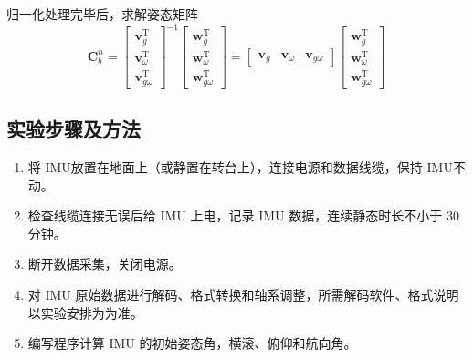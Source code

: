 \documentclass{ctexart}
\begin{document}
归一化处理完毕后，求解姿态矩阵
\begin{equation}
\mathbf{C}_{b}^{n}=\left[\begin{array}{c}
\boldsymbol{v}_{g}^{\mathrm{T}} \\
\boldsymbol{v}_{\omega}^{\mathrm{T}} \\
\boldsymbol{v}_{g \omega}^{\mathrm{T}}
\end{array}\right]^{-1}\left[\begin{array}{c}
\boldsymbol{w}_{g}^{\mathrm{T}} \\
\boldsymbol{w}_{\omega}^{\mathrm{T}} \\
\boldsymbol{w}_{g \omega}^{\mathrm{T}}
\end{array}\right]=\left[\begin{array}{lll}
\boldsymbol{v}_{g} & \boldsymbol{v}_{\omega} & \boldsymbol{v}_{g \omega}
\end{array}\right]\left[\begin{array}{c}
\boldsymbol{w}_{g}^{\mathrm{T}} \\
\boldsymbol{w}_{\omega}^{\mathrm{T}} \\
\boldsymbol{w}_{g \omega}^{\mathrm{T}}
\end{array}\right]
\label{eq:15}
\end{equation}
\subsection{实验步骤及方法}
\begin{enumerate}[(1)]
\item 将 IMU放置在地面上（或静置在转台上），连接电源和数据线缆，保持 IMU不动。
\item 检查线缆连接无误后给 IMU 上电，记录 IMU 数据，连续静态时长不小于 30 分钟。
\item 断开数据采集，关闭电源。
\item 对 IMU 原始数据进行解码、格式转换和轴系调整，所需解码软件、格式说明以实验安排为为准。
\item 编写程序计算 IMU 的初始姿态角，横滚、俯仰和航向角。
\end{enumerate}
\end{document}
